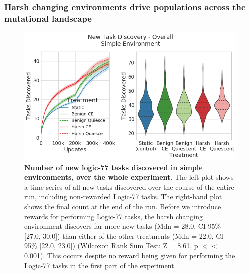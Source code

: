 \documentclass[PhD]{msu-thesis}
\begin{document}
\subsubsection{Harsh changing environments drive populations across the mutational landscape}
	\begin{figure}[!h]
	\includegraphics[width=0.95\columnwidth]{figures/LTE/lte-simple-overall_task_discovery.png}
	\caption{\textbf{Number of new logic-77 tasks discovered in simple environments, over the whole experiment}. The left plot shows a time-series of all new tasks discovered over the course of the entire run, including non-rewarded Logic-77 tasks. The right-hand plot shows the final count at the end of the run. Before we introduce rewards for performing Logic-77 tasks, the harsh changing environment discovers far more new tasks (Mdn = 28.0, CI 95\% [27.0, 30.0]) than either of the other treatments (Mdn = 22.0, CI 95\% [22.0, 23.0]) (Wilcoxon Rank Sum Test: Z = 8.61, p $<<$ 0.001). This occurs despite no reward being given for performing the Logic-77 tasks in the first part of the experiment. %
	}
	\label{fig:simple-overall_task_discovery}
	\end{figure}
\end{document}
